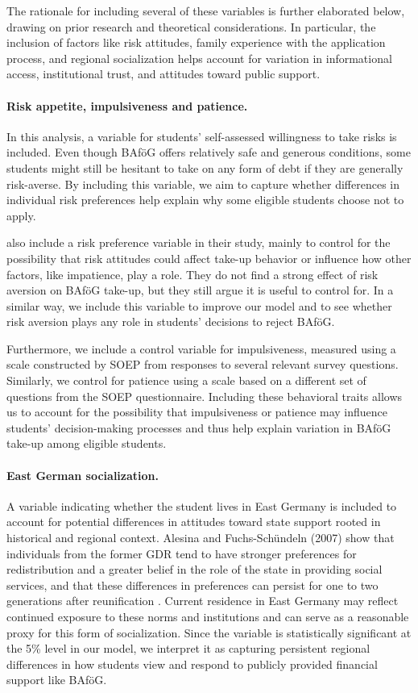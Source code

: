The rationale for including several of these variables is further elaborated below, drawing on prior research and theoretical considerations. In particular, the inclusion of factors like risk attitudes, family experience with the application process, and regional socialization helps account for variation in informational access, institutional trust, and attitudes toward public support.

\paragraph{Risk appetite, impulsiveness and patience.} In this analysis, a variable for students' self-assessed willingness to take risks is included. 
Even though BAföG offers relatively safe and generous conditions, some students might still be hesitant to take on any form of debt if they are generally risk-averse. 
By including this variable, we aim to capture whether differences in individual risk preferences help explain why some eligible students choose not to apply.

\cite{herber_non-take-up_2019} also include a risk preference variable in their study, mainly to control for the possibility that risk attitudes could affect take-up behavior or influence how other factors, like impatience, play a role. 
They do not find a strong effect of risk aversion on BAföG take-up, but they still argue it is useful to control for. 
In a similar way, we include this variable to improve our model and to see whether risk aversion plays any role in students’ decisions to reject BAföG.

Furthermore, we include a control variable for impulsiveness, measured using a scale constructed by SOEP from responses to several relevant survey questions.
Similarly, we control for patience using a scale based on a different set of questions from the SOEP questionnaire.
Including these behavioral traits allows us to account for the possibility that impulsiveness or patience may influence students’ decision-making processes and thus help explain variation in BAföG take-up among eligible students.

\paragraph{East German socialization.}  A variable indicating whether the student lives in East Germany is included to account for potential differences in attitudes toward state support rooted in historical and regional context. Alesina and Fuchs-Schündeln (2007) show that individuals from the former GDR tend to have stronger preferences for redistribution and a greater belief in the role of the state in providing social services, and that these differences in preferences can persist for one to two generations after reunification \citep{alesina_good-bye_2007}. Current residence in East Germany may reflect continued exposure to these norms and institutions and can serve as a reasonable proxy for this form of socialization. Since the variable is statistically significant at the 5\% level in our model, we interpret it as capturing persistent regional differences in how students view and respond to publicly provided financial support like BAföG.


